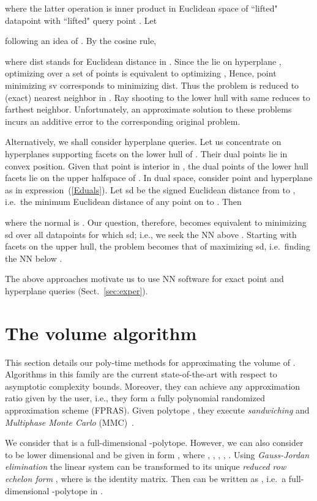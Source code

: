 \documentclass[11pt,a4paper]{article}
\begin{document}
where the latter operation is inner product in Euclidean space 
of ``lifted" datapoint  with
``lifted" query point .
Let 

following an idea of \cite{BasriHZM11}. By the cosine rule, 

where dist stands for Euclidean distance in .
Since the  lie on hyperplane , optimizing
 over a set of points  is equivalent to optimizing
,  
Hence, point  
minimizing sv corresponds to 
minimizing dist. 
Thus the problem is reduced to (exact) nearest neighbor in .
Ray shooting to the lower hull with same  reduces to 
farthest neighbor. 
Unfortunately, an approximate solution to these problems incurs
an additive error to the corresponding original problem.  

Alternatively, we shall consider hyperplane queries.
Let us concentrate on hyperplanes supporting facets on the lower 
hull of .  Their dual points lie in convex position.
Given that point  is interior in , the dual points
of the lower hull facets lie on the upper halfspace of .
In dual space, consider point  and hyperplane  as in expression~(\ref{Eduals}).
Let sd be the signed Euclidean distance from  to , i.e.\
the minimum Euclidean distance of any point on  to .
Then

where the normal is .
Our question, therefore, becomes equivalent to 
minimizing sd over all datapoints  for which
sd; i.e., we seek the NN above .
Starting with facets on the upper hull, the problem becomes that of
maximizing sd, i.e.\ finding the NN below .

The above approaches motivate us to use NN software for exact 
point and hyperplane queries (Sect.~\ref{sec:exper}).
 

\section{The volume algorithm}\label{sec:vol}

This section details our poly-time methods for approximating the volume of .
Algorithms in this family are the current state-of-the-art with
respect to asymptotic complexity bounds.
Moreover, they can achieve any approximation ratio given by the user,
i.e., they form a fully polynomial randomized approximation scheme (FPRAS).
Given polytope , they execute 
{\it sandwiching} and {\it Multiphase Monte Carlo} (MMC)~\cite{Simonovits03}. 

We consider that  is a full-dimensional -polytope. However, we can also consider  to be lower dimensional and be given in form 
, where , ,  , ,  . Using {\it Gauss-Jordan elimination} the linear system  can be transformed to its unique {\it reduced row echelon form} , where  is the identity matrix.  Then  can be written as , i.e.\ a full-dimensional -polytope in . 
\end{document}
